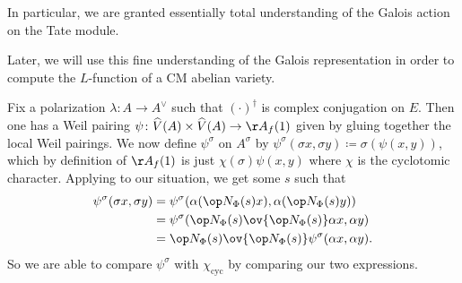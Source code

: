 \documentclass[../notes.tex]{subfiles}
\begin{document}
In particular, we are granted essentially total understanding of the Galois action on the Tate module.
\begin{remark}
	Later, we will use this fine understanding of the Galois representation in order to compute the $L$-function of a CM abelian variety.
\end{remark}
\begin{remark}
	Fix a polarization $\lambda\colon A\to A^\lor$ such that $(\cdot)^\dagger$ is complex conjugation on $E$. Then one has a Weil pairing $\psi\colon\widehat V(A)\times\widehat V(A)\to\AA_f(1)$ given by gluing together the local Weil pairings. We now define $\psi^\sigma$ on $A^\sigma$ by $\psi^\sigma(\sigma x,\sigma y)\coloneqq\sigma(\psi(x,y))$, which by definition of $\AA_f(1)$ is just $\chi(\sigma)\psi(x,y)$ where $\chi$ is the cyclotomic character. Applying  to our situation, we get some $s$ such that
	\begin{align}
		\psi^\sigma(\sigma x,\sigma y) &= \psi^\sigma(\alpha(\op N_\Phi(s)x),\alpha(\op N_\Phi(s)y)) \\
		&= \psi^\sigma(\op N_\Phi(s)\ov{\op N_\Phi(s)}\alpha x,\alpha y) \\
		&= \op N_\Phi(s)\ov{\op N_\Phi(s)}\psi^\sigma(\alpha x,\alpha y).
	\end{align}
	So we are able to compare $\psi^\sigma$ with $\chi_{\mathrm{cyc}}$ by comparing our two expressions.
\end{remark}
\end{document}
